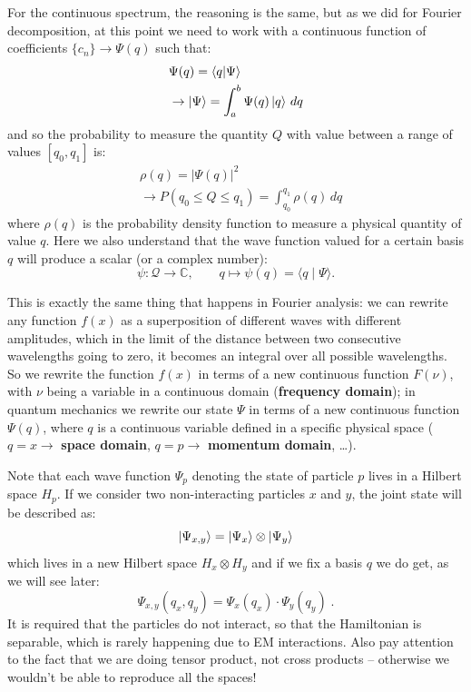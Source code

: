 \documentclass[12pt,a4paper]{article}
\begin{document}
For the continuous spectrum, the reasoning is the same, but as we did for Fourier
decomposition, at this point we need to work with a continuous function of coefficients
$\{c_n\} \rightarrow \Psi(q)$ such that:
\begin{align*}
    &\Psi(q) = \braket{q}{\Psi} \\
    &\rightarrow \ket{\Psi} = \int_{a}^{b} \Psi(q) \ket{q} \, dq
\end{align*}
and so the probability to measure the quantity $Q$ with value between a range of
values $[q_0, q_1]$ is:
\begin{align*}
    &\rho(q) = |\Psi(q)|^2\\
    &\rightarrow P(q_0 \leq Q \leq q_1) = \int_{q_0}^{q_1} \rho(q) \, dq
\end{align*} 
where $\rho(q)$ is the probability density function to measure a physical
quantity of value $q$.
Here we also understand that the wave function valued for a certain basis $q$ will produce a scalar (or a complex number):
\begin{equation*}
	\psi : \mathcal{Q} \longrightarrow \mathbb{C},
	\qquad
	q \longmapsto \psi(q)
	= \langle q \mid \Psi \rangle .
\end{equation*}

This is exactly the same thing that happens in Fourier analysis:
we can rewrite any function $f(x)$ as a superposition of different waves with
different amplitudes, which in the limit of the distance between two consecutive
wavelengths going to zero, it becomes an integral over all possible wavelengths.
So we rewrite the function $f(x)$ in terms of a new continuous function $F(\nu)$,
with $\nu$ being a variable in a continuous domain (\textbf{frequency domain}); in quantum
mechanics we rewrite our state $\Psi$ in terms of a new continuous function
$\Psi(q)$, where $q$ is a continuous variable defined in a specific physical space
($q=x \rightarrow$ \textbf{space domain}, $q=p\rightarrow$ \textbf{momentum domain}, \dots).


Note that each wave function $\Psi_p$ denoting the state of particle $p$ lives in a Hilbert space $H_p$. If we consider two non-interacting particles $x$ and $y$, the joint state will be described as:
\begin{equation*}
	\ket{\Psi_{x,y}} = \ket{\Psi_{x}} \otimes \ket{\Psi_{y}}
\end{equation*}
which lives in a new Hilbert space $H_x \otimes H_y$ and if we fix a basis $q$ we do get, as we will see later:
\begin{equation*}
	\Psi_{x,y}(q_x, q_y) = \Psi_{x}(q_x) \cdot \Psi_{y}(q_y) \;.
\end{equation*}
It is required that the particles do not interact, so that the Hamiltonian is separable, which is rarely happening due to EM interactions. Also pay attention to the fact that we are doing tensor product, not cross products -- otherwise we wouldn't be able to reproduce all the spaces!
\end{document}

